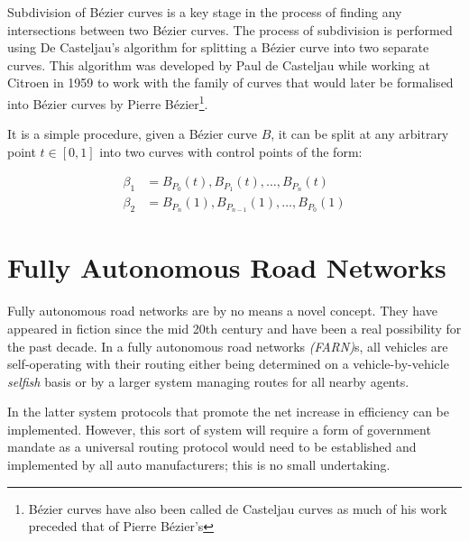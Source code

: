 Subdivision of Bézier curves is a key stage in the process of finding any intersections between two Bézier curves. The process of subdivision is performed using De Casteljau's algorithm for splitting a Bézier curve into two separate curves. This algorithm was developed by Paul de Casteljau while working at Citroen in 1959 to work with the family of curves that would later be formalised into Bézier curves by Pierre Bézier\footnote{Bézier curves have also been called de Casteljau curves as much of his work preceded that of Pierre Bézier's}.

It is a simple procedure, given a Bézier curve $B$, it can be split at any arbitrary point $t \in [0,1]$ into two curves with control points of the form:

\begin{align}
  \beta_{1} &= B_{P_{0}}(t), B_{P_1}(t), \ldots, B_{P_{n}}(t) \\
  \beta_{2} &= B_{P_{n}}(1), B_{P_{n-1}}(1), \ldots, B_{P_{0}}(1)
\end{align}





\section{Fully Autonomous Road Networks}

Fully autonomous road networks are by no means a novel concept. They have appeared in fiction since the mid 20th century and have been a real possibility for the past decade. In a fully autonomous road networks \textit{(FARN)}s, all vehicles are self-operating with their routing either being determined on a vehicle-by-vehicle \textit{selfish} basis or by a larger system managing routes for all nearby agents. 

In the latter system protocols that promote the net increase in efficiency can be implemented. However, this sort of system will require a form of government mandate as a universal routing protocol would need to be established and implemented by all auto manufacturers; this is no small undertaking.


